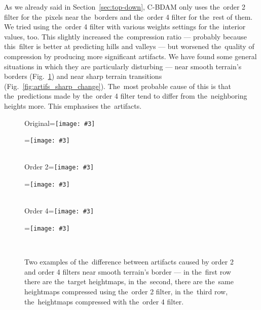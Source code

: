 As we already said in Section~\ref{sec:top-down}, C-BDAM only uses the~order 2 filter for the~pixels near the~borders and the~order 4 filter for the~rest of them. We tried using the~order 4 filter with various weights settings for the~interior values, too. This slightly increased the~compression ratio --- probably because this~filter is better at predicting hills and valleys --- but worsened the~quality of compression by producing more significant artifacts. We have found some general situations in which they are particularly disturbing --- near smooth terrain's borders (Fig.~\ref{fig:artifs_border}) and near sharp terrain transitions (Fig.~\ref{fig:artifs_sharp_change}). The~most probable cause of this is that the~predictions made by the~order 4 filter tend to differ from the~neighboring heights more. This emphasises the~artifacts.

\newcommand{\vcentered}[1]{\begingroup\setbox0=\hbox{#1}\parbox{\wd0}{\box0}\endgroup}

\newcommand{\artifWidth}{160}
\newcommand{\artifHeight}{120}
\newcommand{\incimg}[3]{\texttt{[image: \#3]}}
\newcommand{\incimgvcenter}[3]{\vcentered{\incimg{#1}{#2}{#3}}}
\newcommand{\incartifborder}[1]{\incimgvcenter{\artifWidth}{\artifHeight}{#1}}
\newcommand{\hspacehead}{\hspace{0.4cm}}

\begin{figure}
	\begin{center}
	Original\hspacehead\incartifborder{figures/artif_orig0.png} 
	\incartifborder{figures/artif_orig1.png} \\  
	Order 2\hspacehead\incartifborder{figures/artif_four0.png} 
	\incartifborder{figures/artif_four1.png} \\ 
	Order 4\hspacehead\incartifborder{figures/artif_twelve0.png} 
	\incartifborder{figures/artif_twelve1.png} \\ 
	\end{center}
	\caption{Two examples of the~difference between artifacts caused by order 2 and order 4 filters near smooth terrain's border --- in the~first row there are the~target heightmaps, in the~second, there are the~same heightmaps compressed using the~order 2 filter, in the~third row, the~heightmaps compressed with the~order 4 filter.}
	\label{fig:artifs_border}
\end{figure}

\newcommand{\incartifchange}[1]{\incimgvcenter{\artifWidth}{\artifWidth}{#1}}

